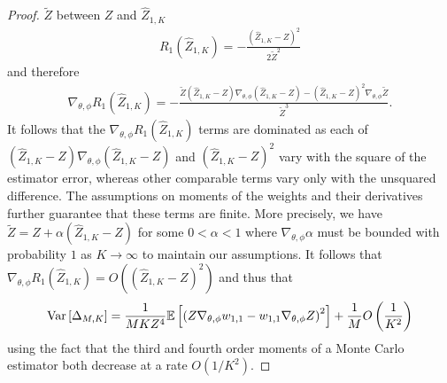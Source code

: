 \begin{proof}
$\tilde{Z}$ between $Z$ and $\hat{Z}_{1,K}$
\begin{align*}
R_1\left(\hat{Z}_{1,K}\right) = -\frac{\left(\hat{Z}_{1,K}-Z\right)^2}{2 \tilde{Z}^2}
\end{align*}
and therefore
\begin{align*}
\nabla_{\theta,\phi} R_1\left(\hat{Z}_{1,K}\right)
=-\frac{\tilde{Z}\left(\hat{Z}_{1,K}-Z\right)\nabla_{\theta,\phi} \left(\hat{Z}_{1,K}-Z\right)
	-\left(\hat{Z}_{1,K}-Z\right)^2 \nabla_{\theta,\phi}\tilde{Z}}{\tilde{Z}^3}.
\end{align*}
It follows that the $\nabla_{\theta,\phi} R_1\left(\hat{Z}_{1,K}\right)$ terms are
dominated as each of $\left(\hat{Z}_{1,K}-Z\right)\nabla_{\theta,\phi} \left(\hat{Z}_{1,K}-Z\right)$
and $\left(\hat{Z}_{1,K}-Z\right)^2$ vary with the square of the estimator error, whereas
other comparable terms vary only with the unsquared difference.  The assumptions on
moments of the weights and their derivatives further guarantee that these terms are finite.
More precisely, we have $\tilde{Z} = Z+\alpha (\hat{Z}_{1,K}-Z)$ for some
$0<\alpha<1$ where $\nabla_{\theta,\phi} \alpha$ must be bounded with 
probability $1$ as $K\to\infty$ to
maintain our assumptions.  It follows that $\nabla_{\theta,\phi} R_1(\hat{Z}_{1,K}) = O((\hat{Z}_{1,K}-Z)^2)$ and thus that
\begin{align}
\label{eq:var}
\text{Var} \left[\Delta_{M,K}\right] = 
\frac{1}{MKZ^4} \mathbb{E} \left[\left(Z \nabla_{\theta,\phi} w_{1,1}-w_{1,1}\nabla_{\theta,\phi} Z\right)^2\right]
+\frac{1}{M}O\left(\frac{1}{K^2}\right)
\end{align}
using the  fact that the third and fourth order moments of a Monte Carlo 
estimator both decrease at a rate $O(1/K^2)$.


\end{proof}
